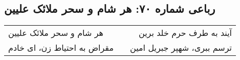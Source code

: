 \begin{center}
\section*{رباعی شماره ۷۰: هر شام و سحر ملائک علیین}
\label{sec:070}
\begin{longtable}{l p{0.5cm} r}
هر شام و سحر ملائک علیین
&&
آیند به طرف حرم خلد برین
\\
مقراض به احتیاط زن، ای خادم
&&
ترسم ببری، شهپر جبریل امین
\\
\end{longtable}
\end{center}
